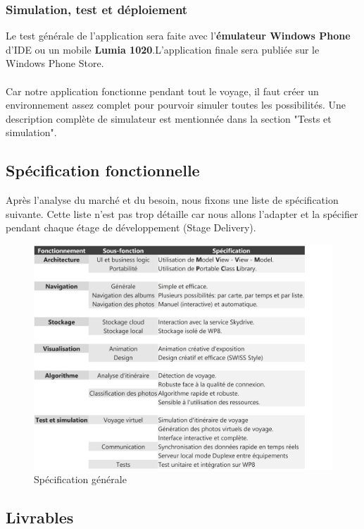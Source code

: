\documentclass{article}
\begin{document}
\subsubsection{\large Simulation, test et déploiement}
Le test générale de l'application sera faite avec l'\textbf{émulateur Windows Phone} d'IDE ou un mobile \textbf{Lumia 1020}.L'application finale sera publiée sur le Windows Phone Store. 
\\\\  
Car notre application fonctionne pendant tout le voyage, il faut créer un environnement assez complet pour pourvoir simuler toutes les possibilités. Une description complète de simulateur est mentionnée dans la section "Tests et simulation".


\newpage
\subsection{\Large Spécification fonctionnelle}

Après l'analyse du marché et du besoin, nous fixons une liste de spécification suivante. Cette liste n'est pas trop détaille car nous allons l'adapter et la spécifier pendant chaque étage de développement (Stage Delivery).

\begin{figure}[h!]
\centering
\includegraphics[width=180mm]{SPEC.jpg}
\caption{Spécification générale}
\end{figure}

\vspace{0.2 cm}
\subsection{\Large Livrables}
\end{document}
